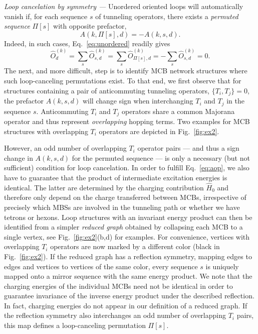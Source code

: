 \documentclass[twocolumn,floats,prx,showpacs]{revtex4-1}
\begin{document}
\emph{Loop cancelation by symmetry ---}
Unordered oriented loops will automatically vanish if, for each sequence $s$ of tunneling operators, there exists a \emph{permuted sequence} $\Pi[s]$ with opposite prefactor, 
\begin{equation}\label{eq:aop}
A(k, \Pi[s],d) = -A(k,s,d).
\end{equation}
Indeed, in such  cases, Eq.~\eqref{eq:unordered} readily gives  
\begin{equation}
\hat O^{(k)}_d=\sum_{s} \hat O^{(k)}_{s,d}  = 
\sum_{s} \hat O^{(k)}_{\Pi[s],d} = - \sum_{s} \hat O^{(k)}_{s,d} = 0.
\end{equation} 
The next, and more difficult, step is to identify MCB network structures where such loop-canceling permutations exist. To that end, we first observe that for structures containing a pair of anticommuting tunneling operators, $\{ T_i, T_j\}=0$, the prefactor $A(k,s,d)$ will change sign when interchanging $T_i$ and $T_j$ in the sequence $s$.   
Anticommuting $T_i$ and $T_j$ operators share a common Majorana operator and thus represent \emph{overlapping} hopping terms. Two examples for MCB structures with overlapping $T_i$ operators are depicted in Fig.~\ref{fig:ex2}. 

However, an odd number of overlapping $T_i$ operator pairs --- and thus a sign change in $A(k,s,d)$ for the 
permuted sequence --- is only a necessary (but not sufficient) condition for loop cancelation.  
In order to fulfill Eq.~\eqref{eq:aop}, we also have to guarantee that the product of intermediate excitation
energies is identical.  The latter are determined by the charging contribution $\hat H_0$
and therefore only depend on the charge transferred between MCBs, irrespective of precisely which 
MBSs are involved in the tunneling path or whether we have tetrons or hexons. 
Loop structures with an invariant energy product can then be identified 
from a simpler \emph{reduced graph} obtained by collapsing each MCB to a single vertex, 
see Fig.~\ref{fig:ex2}(b,d) for examples.
For convenience, vertices with overlapping $T_i$ operators are now marked by a different color (black in Fig.~\ref{fig:ex2}). If the reduced graph has a reflection symmetry, 
mapping edges to edges and vertices to vertices of the same color, 
every sequence $s$ is uniquely mapped onto a mirror sequence with the same energy product. We note that the charging energies of the individual MCBs need not be identical in order to guarantee invariance of the inverse energy product under the described reflection.  In fact, charging energies do not appear in our definition of a reduced graph.  
If the reflection symmetry also interchanges an odd number of overlapping $T_i$ pairs,
this map defines a loop-canceling permutation $\Pi[s]$. 
\end{document}
